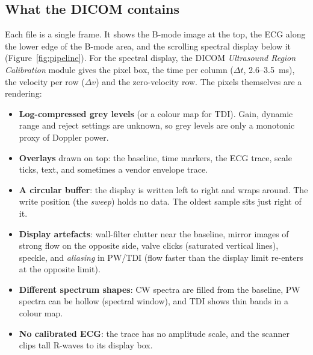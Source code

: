 \documentclass[10pt,a4paper]{article}
\begin{document}
\subsection{What the DICOM contains}
Each file is a single frame. It shows the B-mode image at the top, the ECG along the lower edge of the B-mode
area, and the scrolling spectral display below it (Figure~\ref{fig:pipeline}). For the spectral display, the
DICOM \emph{Ultrasound Region Calibration} module gives the pixel box, the time per column ($\Delta t$, 2.6--3.5~ms),
the velocity per row ($\Delta v$) and the zero-velocity row. The pixels themselves are a rendering:
\begin{itemize}
\item \textbf{Log-compressed grey levels} (or a colour map for TDI). Gain, dynamic range and reject settings
are unknown, so grey levels are only a monotonic proxy of Doppler power.
\item \textbf{Overlays} drawn on top: the baseline, time markers, the ECG trace, scale ticks, text, and sometimes a
vendor envelope trace.
\item \textbf{A circular buffer}: the display is written left to right and wraps around. The write position
(the \emph{sweep}) holds no data. The oldest sample sits just right of it.
\item \textbf{Display artefacts}: wall-filter clutter near the baseline, mirror images of strong flow on the
opposite side, valve clicks (saturated vertical lines), speckle, and \emph{aliasing} in PW/TDI (flow
faster than the display limit re-enters at the opposite limit).
\item \textbf{Different spectrum shapes}: CW spectra are filled from the baseline, PW spectra can be hollow
(spectral window), and TDI shows thin bands in a colour map.
\item \textbf{No calibrated ECG}: the trace has no amplitude scale, and the scanner clips tall R-waves to its display box.
\end{itemize}
\end{document}
